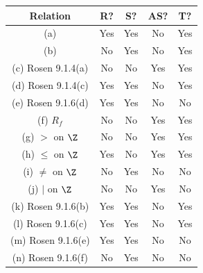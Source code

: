 \begin{questions}
\begin{solution}
\begin{tabular}{|c||c|c|c|c|}
	\hline 
		\textbf{Relation} & \textbf{R?} & \textbf{S?} & \textbf{AS?} & \textbf{T?} \\
	\hline 
		(a)  	&  \hspace{0.1in}Yes\hspace{0.1in} 
				& \hspace{0.1in}Yes\hspace{0.1in} 
				& \hspace{0.1in}No\hspace{0.1in} 
				&  \hspace{0.1in}Yes\hspace{0.1in} \\
		(b) & 	No & Yes & No & Yes \\
		(c) Rosen 9.1.4(a) 	& 	No & No & Yes & Yes \\
		(d) Rosen 9.1.4(c) 	& 	Yes & Yes & No & Yes \\
		(e) Rosen 9.1.6(d) 	&   Yes & Yes & No & No \\
		(f) $R_f$ 			& 	No	& No	& Yes	& Yes  \\
		(g) $>$ on $\Z$		&   No 	& No 	& Yes 	& Yes \\  %
		(h) $\leq$ on $\Z$  &  	Yes & No 	& Yes   & Yes \\  %
		(i) $\neq$ on $\Z$ 	& 	No  & Yes 	&   No 	& No \\  %
		(j) $|$ on $\Z$ 	&   No 	& No 	&   Yes & No \\   %
		(k) Rosen 9.1.6(b) 	&   Yes & Yes 	& No 	& Yes \\  
		(l) Rosen 9.1.6(c)  & Yes	& Yes 	& No 	& Yes \\
		(m) Rosen 9.1.6(e)  & Yes 	& Yes 	& No 	& No \\
		(n) Rosen 9.1.6(f) 	& No 	& Yes 	& No 	& No 
	\hline 
\end{tabular}



\end{solution}
\end{questions}
